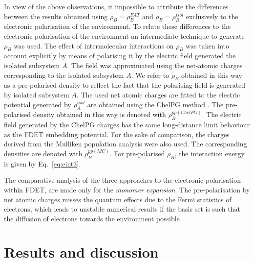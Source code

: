 \documentclass[journal=jctcce,manuscript=article]{achemso}
\newcommand{\nr}[1]{\color{red}#1\color{black}}
\begin{document}
In view of the above observations, it impossible to attribute the differences between the results obtained using $\rho_B=\rho_B^{FAT}$ and  $\rho_B=\rho_B^{isol}$  exclusively to the electronic polarisation of the environment.
To relate these differences to the electronic polarisation of the environment an intermediate technique to generate 
 $\rho_B$ was used.
The effect of intermolecular interactions on 
$\rho_B$ was taken into account explicitly
 by means of polarising it by the electric field generated the isolated subsystem $A$. 
The field was approximated using the net-atomic charges corresponding to the isolated subsystem $A$.  
We refer to $\rho_B$ obtained in this way as a pre-polarised density to reflect the fact that the polarising field is generated by isolated subsystem $A$.
The used net atomic charges are fitted to the electric potential generated by $\rho_A^{isol}$  are obtained using the ChelPG method \cite{Breneman1990}.
The pre-polarised density obtained in this way is denoted with  $\rho_B^{pp(ChelPG)}$.
The electric field generated by the  ChelPG  charges has the same long-distance limit behaviour as the FDET embedding potential.
\nr{For the sake of comparison},  the charges derived from the Mulliken population analysis \cite{Mulliken1955} were also used.
The corresponding densities are denoted with  $\rho_B^{pp(MC)}$.  
For pre-polarised  $\rho_B$,  the interaction energy is given by Eq.~\ref{eq:eint3}.

The comparative analysis of the three approaches to the electronic polarisation within FDET, %
are made only for the {\it monomer expansion}. The pre-polarisation by net atomic charges misses the quantum effects due to the Fermi statistics of electrons, which leads to unstable numerical results if the basis set is such that the diffusion of electrons towards the environment possible  \cite{Fradelos2011a,Fradelos2011c}.

\section{Results and discussion}
\end{document}
